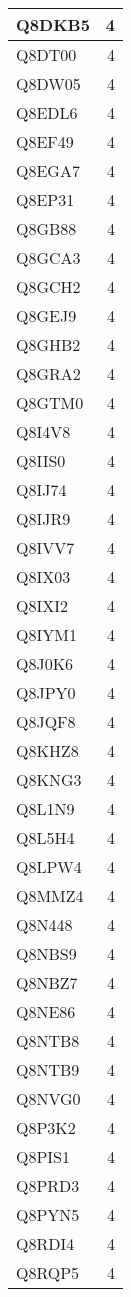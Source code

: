 \documentclass[
]{book}
\theoremstyle{definition}
\theoremstyle{definition}
\theoremstyle{definition}
\theoremstyle{definition}
\theoremstyle{remark}
\begin{document}
\begin{table}
\begin{tabular}{l|r}
\hline
Q8DKB5 & 4\\
\hline
Q8DT00 & 4\\
\hline
Q8DW05 & 4\\
\hline
Q8EDL6 & 4\\
\hline
Q8EF49 & 4\\
\hline
Q8EGA7 & 4\\
\hline
Q8EP31 & 4\\
\hline
Q8GB88 & 4\\
\hline
Q8GCA3 & 4\\
\hline
Q8GCH2 & 4\\
\hline
Q8GEJ9 & 4\\
\hline
Q8GHB2 & 4\\
\hline
Q8GRA2 & 4\\
\hline
Q8GTM0 & 4\\
\hline
Q8I4V8 & 4\\
\hline
Q8IIS0 & 4\\
\hline
Q8IJ74 & 4\\
\hline
Q8IJR9 & 4\\
\hline
Q8IVV7 & 4\\
\hline
Q8IX03 & 4\\
\hline
Q8IXI2 & 4\\
\hline
Q8IYM1 & 4\\
\hline
Q8J0K6 & 4\\
\hline
Q8JPY0 & 4\\
\hline
Q8JQF8 & 4\\
\hline
Q8KHZ8 & 4\\
\hline
Q8KNG3 & 4\\
\hline
Q8L1N9 & 4\\
\hline
Q8L5H4 & 4\\
\hline
Q8LPW4 & 4\\
\hline
Q8MMZ4 & 4\\
\hline
Q8N448 & 4\\
\hline
Q8NBS9 & 4\\
\hline
Q8NBZ7 & 4\\
\hline
Q8NE86 & 4\\
\hline
Q8NTB8 & 4\\
\hline
Q8NTB9 & 4\\
\hline
Q8NVG0 & 4\\
\hline
Q8P3K2 & 4\\
\hline
Q8PIS1 & 4\\
\hline
Q8PRD3 & 4\\
\hline
Q8PYN5 & 4\\
\hline
Q8RDI4 & 4\\
\hline
Q8RQP5 & 4\\

\end{tabular}
\end{table}
\end{document}

